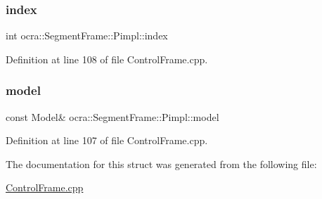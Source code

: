 \subsubsection{\texorpdfstring{index}{index}}
{\footnotesize\ttfamily int ocra\+::\+Segment\+Frame\+::\+Pimpl\+::index}



Definition at line 108 of file Control\+Frame.\+cpp.

\hypertarget{structocra_1_1SegmentFrame_1_1Pimpl_a787a1cc368ab12229ecd11358e2805e1}{}\label{structocra_1_1SegmentFrame_1_1Pimpl_a787a1cc368ab12229ecd11358e2805e1} 
\subsubsection{\texorpdfstring{model}{model}}
{\footnotesize\ttfamily const Model\& ocra\+::\+Segment\+Frame\+::\+Pimpl\+::model}



Definition at line 107 of file Control\+Frame.\+cpp.



The documentation for this struct was generated from the following file\+:\begin{DoxyCompactItemize}
\item 
\hyperlink{ControlFrame_8cpp}{Control\+Frame.\+cpp}\end{DoxyCompactItemize}
